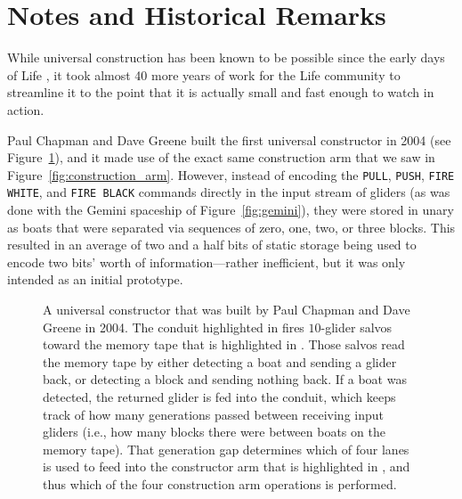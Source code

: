 \section{Notes and Historical Remarks}\label{sec:universal_construction_history}

While universal construction has been known to be possible since the early days of Life \cite{Wain74,BCG82}, it took almost 40 more years of work for the Life community to streamline it to the point that it is actually small and fast enough to watch in action.

Paul Chapman and Dave Greene built the first universal constructor in 2004 (see Figure~\ref{fig:chapman_greene_constructor}), and it made use of the exact same construction arm that we saw in Figure~\ref{fig:construction_arm}. However, instead of encoding the \texttt{PULL}, \texttt{PUSH}, \texttt{FIRE WHITE}, and \texttt{FIRE BLACK} commands directly in the input stream of gliders (as was done with the Gemini spaceship of Figure~\ref{fig:gemini}), they were stored in unary as boats that were separated via sequences of zero, one, two, or three blocks. This resulted in an average of two and a half bits of static storage being used to encode two bits' worth of information---rather inefficient, but it was only intended as an initial prototype.

\begin{figure}[!htbp]
	\centering
	\caption{A universal constructor that was built by Paul Chapman and Dave Greene in 2004. The conduit highlighted in  fires $10$-glider salvos toward the memory tape that is highlighted in . Those salvos read the memory tape by either detecting a boat and sending a glider back, or detecting a block and sending nothing back. If a boat was detected, the returned glider is fed into the  conduit, which keeps track of how many generations passed between receiving input gliders (i.e., how many blocks there were between boats on the memory tape). That generation gap determines which of four lanes is used to feed into the constructor arm that is highlighted in , and thus which of the four construction arm operations is performed.}\label{fig:chapman_greene_constructor}
\end{figure}

